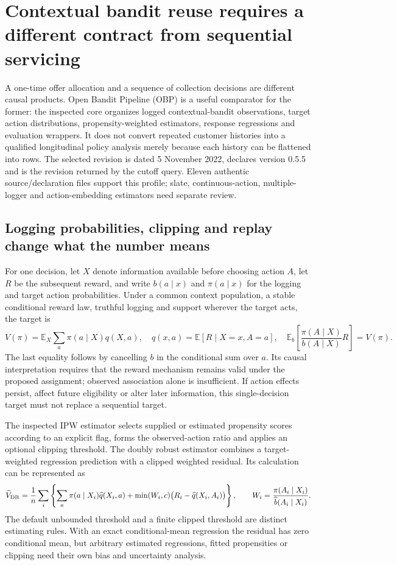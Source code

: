 \section{Contextual bandit reuse requires a different contract from sequential servicing}
\label{exec23:obp-scope}
A one-time offer allocation and a sequence of collection decisions are different
causal products. Open Bandit Pipeline (OBP) is a useful comparator for the former:
the inspected core organizes logged contextual-bandit observations, target
action distributions, propensity-weighted estimators, response regressions and
evaluation wrappers. It does not convert repeated customer histories into a
qualified longitudinal policy analysis merely because each history can be
flattened into rows. The selected revision is dated 5 November 2022, declares
version 0.5.5 and is the revision returned by the cutoff query. Eleven authentic
source/declaration files support this profile; slate, continuous-action,
multiple-logger and action-embedding estimators need separate review.
\cite{exec23_obp_sources}

\subsection{Logging probabilities, clipping and replay change what the number means}
\label{exec23:obp-target}
For one decision, let $X$ denote information available before choosing action
$A$, let $R$ be the subsequent reward, and write $b(a\mid x)$ and
$\pi(a\mid x)$ for the logging and target action probabilities. Under a common
context population, a stable conditional reward law, truthful logging and
support wherever the target acts, the target is
\[
 V(\pi)=\mathbb E_X\sum_a\pi(a\mid X)q(X,a),
 \quad q(x,a)=\mathbb E[R\mid X=x,A=a],
 \quad \mathbb E_b\!\left[\frac{\pi(A\mid X)}{b(A\mid X)}R\right]=V(\pi).
\]
The last equality follows by cancelling $b$ in the conditional sum over $a$.
Its causal interpretation requires that the reward mechanism remains valid
under the proposed assignment; observed association alone is insufficient.
If action effects persist, affect future eligibility or alter later information,
this single-decision target must not replace a sequential target.

The inspected IPW estimator selects supplied or estimated propensity scores
according to an explicit flag, forms the observed-action ratio and applies an
optional clipping threshold. The doubly robust estimator combines a
target-weighted regression prediction with a clipped weighted residual. Its
calculation can be represented as
\[
 \widehat V_{\rm DR}=\frac1n\sum_i\left\{
 \sum_a\pi(a\mid X_i)\widehat q(X_i,a)
 +\min(W_i,c)\big(R_i-\widehat q(X_i,A_i)\big)\right\},
 \qquad W_i=\frac{\pi(A_i\mid X_i)}{\widehat b(A_i\mid X_i)}.
\]
The default unbounded threshold and a finite clipped threshold are distinct
estimating rules. With an exact conditional-mean regression the residual has
zero conditional mean, but arbitrary estimated regressions, fitted propensities
or clipping need their own bias and uncertainty analysis.
\cite{exec23_obp_sources}

